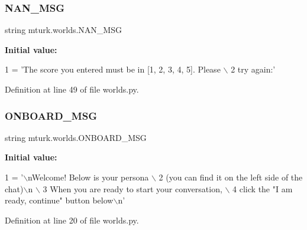 \subsubsection{\texorpdfstring{N\+A\+N\+\_\+\+M\+SG}{NAN\_MSG}}
{\footnotesize\ttfamily string mturk.\+worlds.\+N\+A\+N\+\_\+\+M\+SG}

{\bfseries Initial value\+:}
\begin{DoxyCode}
1 =  \textcolor{stringliteral}{'The score you entered must be in [1, 2, 3, 4, 5]. Please \(\backslash\)}
2 \textcolor{stringliteral}{        try again:'}
\end{DoxyCode}


Definition at line 49 of file worlds.\+py.

\mbox{\label{namespacemturk_1_1worlds_a6eed507f42a105d40cffade5287a7a0a}} 
\subsubsection{\texorpdfstring{O\+N\+B\+O\+A\+R\+D\+\_\+\+M\+SG}{ONBOARD\_MSG}}
{\footnotesize\ttfamily string mturk.\+worlds.\+O\+N\+B\+O\+A\+R\+D\+\_\+\+M\+SG}

{\bfseries Initial value\+:}
\begin{DoxyCode}
1 =  \textcolor{stringliteral}{'\(\backslash\)nWelcome! Below is your persona \(\backslash\)}
2 \textcolor{stringliteral}{        (you can find it on the left side of the chat)\(\backslash\)n \(\backslash\)}
3 \textcolor{stringliteral}{        When you are ready to start your conversation, \(\backslash\)}
4 \textcolor{stringliteral}{        click the "I am ready, continue" button below\(\backslash\)n'}
\end{DoxyCode}


Definition at line 20 of file worlds.\+py.

\mbox{\label{namespacemturk_1_1worlds_a6ec14ac5caca2a339cfaef5b3abeb59d}} 
